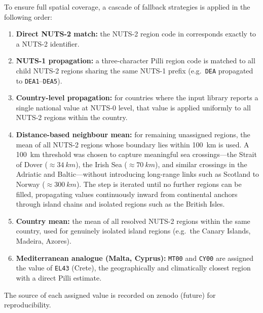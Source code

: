 \documentclass[12pt, a4paper]{article}
\begin{document}
To ensure full spatial coverage, a cascade of fallback strategies is applied
in the following order:

\begin{enumerate}[leftmargin=2em]
    \item \textbf{Direct NUTS-2 match:} the NUTS-2 region code in \cite{Pilli2024Zenodo} corresponds
          exactly to a NUTS-2 identifier.
    \item \textbf{NUTS-1 propagation:} a three-character Pilli region code is
          matched to all child NUTS-2 regions sharing the same NUTS-1 prefix
          (e.g.\ \texttt{DEA} propagated to \texttt{DEA1}--\texttt{DEA5}).
    \item \textbf{Country-level propagation:} for countries where the input
          library reports a single national value at NUTS-0 level,
          that value is applied uniformly to all NUTS-2 regions within the
          country.
    \item \textbf{Distance-based neighbour mean:} for remaining unassigned
          regions, the mean of all NUTS-2 regions whose boundary lies within
          \SI{100}{km} is used. A \SI{100}{km} threshold was chosen to
          capture meaningful sea crossings---the Strait of Dover
          (${\approx}\SI{34}{km}$), the Irish Sea (${\approx}\SI{70}{km}$),
          and similar crossings in the Adriatic and Baltic---without
          introducing long-range links such as Scotland to Norway
          (${\approx}\SI{300}{km}$). The step is iterated until no further
          regions can be filled, propagating values continuously inward from
          continental anchors through island chains and isolated regions such
          as the British Isles.
    \item \textbf{Country mean:} the mean of all resolved NUTS-2 regions
          within the same country, used for genuinely isolated island regions
          (e.g.\ the Canary Islands, Madeira, Azores).
    \item \textbf{Mediterranean analogue (Malta, Cyprus):} \texttt{MT00} and
          \texttt{CY00} are assigned the value of \texttt{EL43} (Crete), the
          geographically and climatically closest region with a direct Pilli
          estimate.
\end{enumerate}


The source of each assigned value is recorded on zenodo (future) \cite{Alamia_Zenodo2026} for reproducibility.

\end{document}
